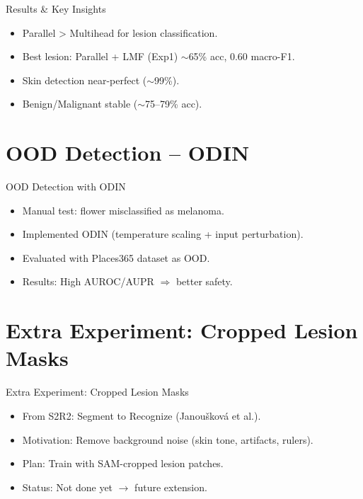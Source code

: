 \documentclass[aspectratio=169]{beamer}
\begin{document}
\begin{frame}{Results \& Key Insights}
  \begin{itemize}
    \item Parallel > Multihead for lesion classification.
    \item Best lesion: Parallel + LMF (Exp1) $\sim$65\% acc, 0.60 macro-F1.
    \item Skin detection near-perfect ($\sim$99\%).
    \item Benign/Malignant stable ($\sim$75--79\% acc).
  \end{itemize}
\end{frame}


\section{OOD Detection -- ODIN}

\begin{frame}{OOD Detection with ODIN}
  \begin{itemize}
    \item Manual test: flower misclassified as melanoma.
    \item Implemented ODIN (temperature scaling + input perturbation).
    \item Evaluated with Places365 dataset as OOD.
    \item Results: High AUROC/AUPR $\Rightarrow$ better safety.
  \end{itemize}
\end{frame}


\section{Extra Experiment: Cropped Lesion Masks}

\begin{frame}{Extra Experiment: Cropped Lesion Masks}
  \begin{itemize}
    \item From S2R2: Segment to Recognize (Janou\v{s}kov\'a et al.).
    \item Motivation: Remove background noise (skin tone, artifacts, rulers).
    \item Plan: Train with SAM-cropped lesion patches.
    \item Status: Not done yet $\rightarrow$ future extension.
  \end{itemize}
\end{frame}
\end{document}
